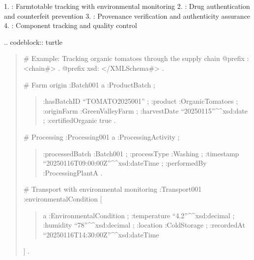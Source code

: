 \documentclass[letterpaper,10pt,english]{sphinxmanual}
\begin{document}
\sphinxAtStartPar
{}
1. : Farm\sphinxhyphen{}to\sphinxhyphen{}table tracking with environmental monitoring
2. : Drug authentication and counterfeit prevention
3. : Provenance verification and authenticity assurance
4. : Component tracking and quality control

\sphinxAtStartPar
{}
.. code\sphinxhyphen{}block:: turtle
\begin{quote}

\sphinxAtStartPar
\# Example: Tracking organic tomatoes through the supply chain
@prefix : \textless{}\sphinxhyphen{}chain\#\textgreater{} .
@prefix xsd: \textless{}/XMLSchema\#\textgreater{} .

\sphinxAtStartPar
\# Farm origin
:Batch001 a :ProductBatch ;
\begin{quote}

\sphinxAtStartPar
:hasBatchID “TOMATO\sphinxhyphen{}2025\sphinxhyphen{}001” ;
:product :OrganicTomatoes ;
:originFarm :GreenValleyFarm ;
:harvestDate “2025\sphinxhyphen{}01\sphinxhyphen{}15”\textasciicircum{}\textasciicircum{}xsd:date ;
:certifiedOrganic true .
\end{quote}

\sphinxAtStartPar
\# Processing
:Processing001 a :ProcessingActivity ;
\begin{quote}

\sphinxAtStartPar
:processedBatch :Batch001 ;
:processType :Washing ;
:timestamp “2025\sphinxhyphen{}01\sphinxhyphen{}16T09:00:00Z”\textasciicircum{}\textasciicircum{}xsd:dateTime ;
:performedBy :ProcessingPlantA .
\end{quote}

\sphinxAtStartPar
\# Transport with environmental monitoring
:Transport001 :environmentalCondition {[}
\begin{quote}

\sphinxAtStartPar
a :EnvironmentalCondition ;
:temperature “4.2”\textasciicircum{}\textasciicircum{}xsd:decimal ;
:humidity “78”\textasciicircum{}\textasciicircum{}xsd:decimal ;
:location :ColdStorage ;
:recordedAt “2025\sphinxhyphen{}01\sphinxhyphen{}16T14:30:00Z”\textasciicircum{}\textasciicircum{}xsd:dateTime
\end{quote}

\sphinxAtStartPar
{]} .
\end{quote}
\end{document}
